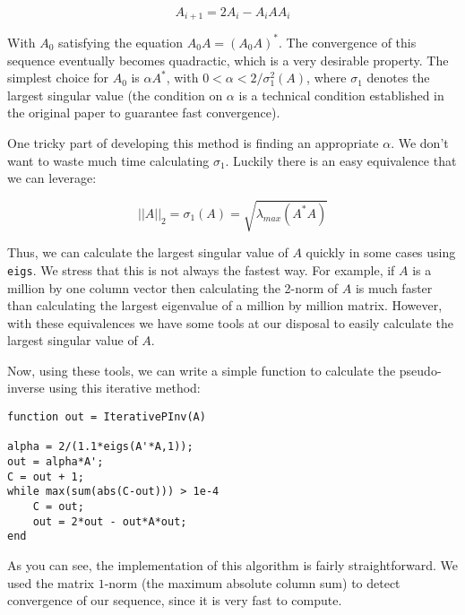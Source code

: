 \[
A_{i+1} = 2A_i - A_i A A_i
\]

With $A_0$ satisfying the equation $A_0 A = (A_0 A)^*$. The convergence of this sequence eventually becomes quadractic, which is a very desirable property. The simplest choice for $A_0$ is $\alpha A^*$, with $0 < \alpha < 2/\sigma_1^2(A)$, where $\sigma_1$ denotes the largest singular value (the condition on $\alpha$ is a technical condition established in the original paper to guarantee fast convergence).

One tricky part of developing this method is finding an appropriate $\alpha$. We don't want to waste much time calculating $\sigma_1$. Luckily there is an easy equivalence that we can leverage:

\[
||A||_2 = \sigma_1(A) = \sqrt{\lambda_{max} (A^* A)}
\]

Thus, we can calculate the largest singular value of $A$ quickly in some cases using {\tt eigs}. We stress that this is not always the fastest way. For example, if $A$ is a million by one column vector then calculating the 2-norm of $A$ is much faster than calculating the largest eigenvalue of a million by million matrix. However, with these equivalences we have some tools at our disposal to easily calculate the largest singular value of $A$.

Now, using these tools, we can write a simple function to calculate the pseudo-inverse using this iterative method:

\begin{verbatim}
function out = IterativePInv(A)

alpha = 2/(1.1*eigs(A'*A,1));
out = alpha*A';
C = out + 1;
while max(sum(abs(C-out))) > 1e-4
    C = out;
    out = 2*out - out*A*out;
end
\end{verbatim}

As you can see, the implementation of this algorithm is fairly straightforward. We used the matrix $1$-norm (the maximum absolute column sum) to detect convergence of our sequence, since it is very fast to compute.

